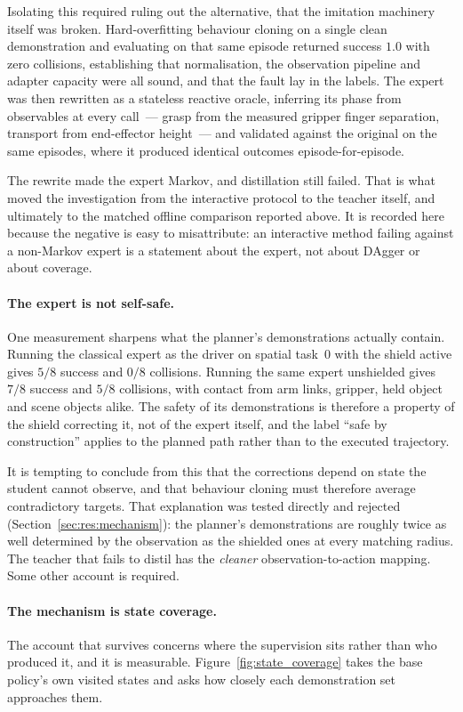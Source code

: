 Isolating this required ruling out the alternative, that the imitation machinery itself was broken.
Hard-overfitting behaviour cloning on a single clean demonstration and evaluating on that same
episode returned success $1.0$ with zero collisions, establishing that normalisation, the
observation pipeline and adapter capacity were all sound, and that the fault lay in the labels. The
expert was then rewritten as a stateless reactive oracle, inferring its phase from observables at
every call~--- grasp from the measured gripper finger separation, transport from end-effector
height~--- and validated against the original on the same episodes, where it produced identical
outcomes episode-for-episode.

The rewrite made the expert Markov, and distillation still failed. That is what moved the
investigation from the interactive protocol to the teacher itself, and ultimately to the matched
offline comparison reported above. It is recorded here because the negative is easy to misattribute:
an interactive method failing against a non-Markov expert is a statement about the expert, not about
DAgger or about coverage.

\paragraph{The expert is not self-safe.}
One measurement sharpens what the planner's demonstrations actually contain. Running the classical
expert as the driver on spatial task~0 with the shield active gives $5/8$ success and $0/8$
collisions. Running the same expert unshielded gives $7/8$ success and $5/8$ collisions, with
contact from arm links, gripper, held object and scene objects alike. The safety of its
demonstrations is therefore a property of the shield correcting it, not of the expert itself, and
the label ``safe by construction'' applies to the planned path rather than to the executed
trajectory.

It is tempting to conclude from this that the corrections depend on state the student cannot
observe, and that behaviour cloning must therefore average contradictory targets. That explanation
was tested directly and rejected (Section~\ref{sec:res:mechanism}): the planner's demonstrations
are roughly twice as well determined by the observation as the shielded ones at every matching
radius. The teacher that fails to distil has the \emph{cleaner} observation-to-action mapping. Some
other account is required.

\paragraph{The mechanism is state coverage.}
The account that survives concerns where the supervision sits rather than who produced it, and it
is measurable. Figure~\ref{fig:state_coverage} takes the base policy's own visited states and asks
how closely each demonstration set approaches them.

